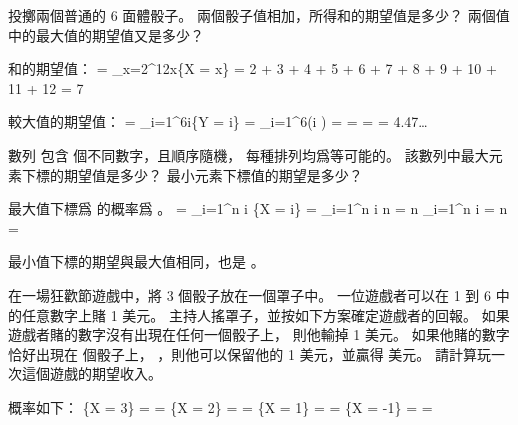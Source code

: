 \startsection[
  title={Discrete random variables},
]

\startEXERCISE
投擲兩個普通的 6 面體骰子。
兩個骰子值相加，所得和的期望值是多少？
兩個值中的最大值的期望值又是多少？
\stopEXERCISE

\startANSWER
和的期望值：
\startformula\startmathalignment
\NC \E[X] \NC = \sum_{x=2}^{12}x\Pr\{X = x\} \NR
\NC \NC =  2 \cdot {} +
           3 \cdot {} +
           4 \cdot {} +
           5 \cdot {} +
           6 \cdot {} +
           7 \cdot {} +
           8 \cdot {} +
           9 \cdot {} +
          10 \cdot {} +
          11 \cdot {} +
          12 \cdot {} \NR
\NC \NC = 7 \NR
\stopmathalignment\stopformula

較大值的期望值：
\startformula\startmathalignment
\NC \E[Y]
    \NC = \sum_{i=1}^{6}i\Pr\{Y = i\} \NR
\NC \NC = \sum_{i=1}^{6}\left(i \cdot {}\right) \NR
\NC \NC =  \NR
\NC \NC =  \NR
\NC \NC =  = 4.47\ldots \NR
\stopmathalignment\stopformula
\stopANSWER

\startEXERCISE
數列  包含  個不同數字，且順序隨機，
每種排列均爲等可能的。
該數列中最大元素下標的期望值是多少？
最小元素下標值的期望是多少？
\stopEXERCISE

\startANSWER
最大值下標爲  的概率爲 。
\startformula\startmathalignment
\NC \E[X]
    \NC = \sum_{i=1}^n i \cdot \Pr\{X = i\} \NR
\NC \NC = \sum_{i=1}^n i \cdot {} n \NR
\NC \NC =  n \sum_{i=1}^n i \NR
\NC \NC =  n  \NR
\NC \NC =  \NR
\stopmathalignment\stopformula

最小值下標的期望與最大值相同，也是 。
\stopANSWER

\startEXERCISE
在一場狂歡節遊戲中，將 3 個骰子放在一個罩子中。
一位遊戲者可以在 1 到 6 中的任意數字上賭 1 美元。
主持人搖罩子，並按如下方案確定遊戲者的回報。
如果遊戲者賭的數字沒有出現在任何一個骰子上，
則他輸掉 1 美元。
如果他賭的數字恰好出現在  個骰子上，
 ，則他可以保留他的 1 美元，並贏得  美元。
請計算玩一次這個遊戲的期望收入。
\stopEXERCISE

\startANSWER
概率如下：
\startformula\startmathalignment
\NC \Pr\{X = 3\} \NC =  \cdot {} \cdot {}
                     =  \NR
\NC \Pr\{X = 2\} \NC = 
                       \cdot {} \cdot {} \cdot {}
		     =  \NR
\NC \Pr\{X = 1\} \NC = 
                       \cdot {} \cdot {} \cdot {}
		     =  \NR
\NC \Pr\{X = -1\} \NC =  \cdot {} \cdot {}
		     =  \NR
\stopmathalignment\stopformula

